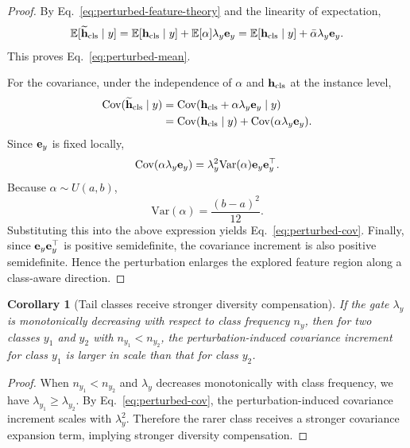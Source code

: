 \documentclass[journal]{IEEEtran}
\theoremstyle{plain}
\newtheorem{corollary}[theorem]{Corollary}
\theoremstyle{definition}
\theoremstyle{remark}
\begin{document}
\begin{proof}
By Eq.~\eqref{eq:perturbed-feature-theory} and the linearity of expectation,
\begin{equation}
\mathbb{E}[\widetilde{\bf h}_{\mathrm{cls}}\mid y]
=
\mathbb{E}[{\bf h}_{\mathrm{cls}}\mid y]+\mathbb{E}[\alpha]\lambda_y {\bf e}_y
=
\mathbb{E}[{\bf h}_{\mathrm{cls}}\mid y]+\bar{\alpha}\lambda_y {\bf e}_y.
\end{equation}
This proves Eq.~\eqref{eq:perturbed-mean}.

For the covariance, under the independence of $\alpha$ and ${\bf h}_{\mathrm{cls}}$ at the instance level,
\begin{align}
\mathrm{Cov}(\widetilde{\bf h}_{\mathrm{cls}}\mid y)
&=
\mathrm{Cov}({\bf h}_{\mathrm{cls}}+\alpha\lambda_y {\bf e}_y\mid y) \\
&=
\mathrm{Cov}({\bf h}_{\mathrm{cls}}\mid y)+\mathrm{Cov}(\alpha\lambda_y {\bf e}_y).
\end{align}
Since ${\bf e}_y$ is fixed locally,
\begin{equation}
\mathrm{Cov}(\alpha\lambda_y {\bf e}_y)
=
\lambda_y^2 \mathrm{Var}(\alpha) {\bf e}_y{\bf e}_y^\top.
\end{equation}
Because $\alpha\sim U(a,b)$,
\begin{equation}
\mathrm{Var}(\alpha)=\frac{(b-a)^2}{12}.
\end{equation}
Substituting this into the above expression yields Eq.~\eqref{eq:perturbed-cov}. Finally, since ${\bf e}_y{\bf e}_y^\top$ is positive semidefinite, the covariance increment is also positive semidefinite. Hence the perturbation enlarges the explored feature region along a class-aware direction.
\end{proof}

\begin{corollary}[Tail classes receive stronger diversity compensation]
\label{cor:tail-diversity}
If the gate $\lambda_y$ is monotonically decreasing with respect to class frequency $n_y$, then for two classes $y_1$ and $y_2$ with $n_{y_1}<n_{y_2}$, the perturbation-induced covariance increment for class $y_1$ is larger in scale than that for class $y_2$.
\end{corollary}

\begin{proof}
When $n_{y_1}<n_{y_2}$ and $\lambda_y$ decreases monotonically with class frequency, we have $\lambda_{y_1}\ge \lambda_{y_2}$. By Eq.~\eqref{eq:perturbed-cov}, the perturbation-induced covariance increment scales with $\lambda_y^2$. Therefore the rarer class receives a stronger covariance expansion term, implying stronger diversity compensation.
\end{proof}
\end{document}
